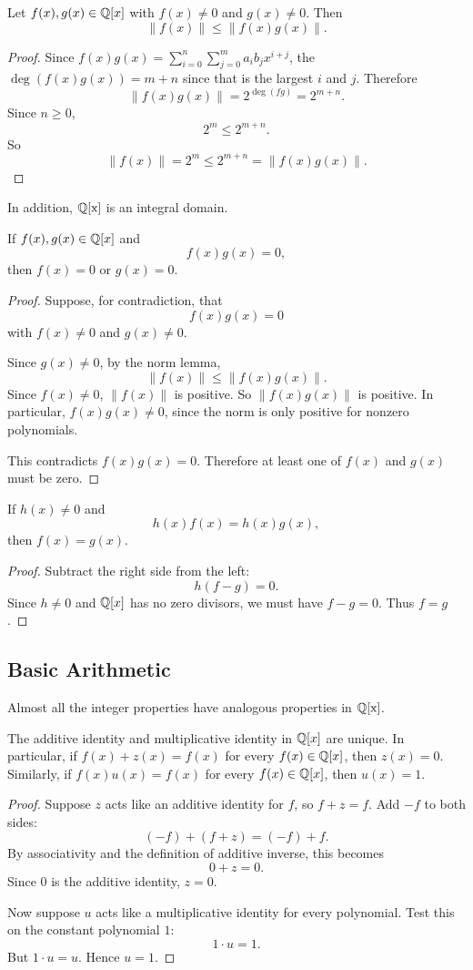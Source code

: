 \begin{lemma}
Let $f(x),g(x)\in\mathbb{Q}[x]$ with $f(x)\neq0$ and $g(x)\neq0$. Then
\[
\|f(x)\|\leq \|f(x)g(x)\|.
\]
\end{lemma}

\begin{proof}
Since $f(x)g(x) =  \sum_{i=0}^{n} \sum_{j=0}^{m} a_i b_j x^{i+j}$, the $\deg(f(x)g(x)) = m+n$ since that is the largest $i$ and $j$.
Therefore
\[
\|f(x)g(x)\|=2^{\deg(fg)}=2^{m+n}.
\]
Since $n\geq0$,
\[
2^m\leq2^{m+n}.
\]
So
\[
\|f(x)\|=2^m\leq2^{m+n}=\|f(x)g(x)\|.
\]
\end{proof}

In addition, $\operatorname{\mathbb{Q}[x]}$ is an integral domain.
\begin{theorem}
If $f(x),g(x)\in\mathbb{Q}[x]$ and
\[
f(x)g(x)=0,
\]
then $f(x)=0$ or $g(x)=0$.
\end{theorem}
\begin{proof}
Suppose, for contradiction, that
\[
f(x)g(x)=0
\]
with $f(x)\neq0$ and $g(x)\neq0$.

Since $g(x)\neq0$, by the norm lemma,
\[
\|f(x)\|\leq \|f(x)g(x)\|.
\]
Since $f(x)\neq0$, $\|f(x)\|$ is positive.
So $\|f(x)g(x)\|$ is positive. In particular, $f(x)g(x)\neq0$, since the norm
is only positive for nonzero polynomials.

This contradicts $f(x)g(x)=0$. Therefore at least one of $f(x)$ and $g(x)$
must be zero.
\end{proof}

\begin{corollary}[Cancellation]
If $h(x)\neq0$ and
\[
h(x)f(x)=h(x)g(x),
\]
then $f(x)=g(x)$.
\end{corollary}
\begin{proof}
Subtract the right side from the left:
\[
h(f-g)=0.
\]
Since $h\neq0$ and $\mathbb{Q}[x]$ has no zero divisors, we must have
$f-g=0$.  Thus $f=g$.
\end{proof}

\subsection{Basic Arithmetic}

Almost all the integer properties have analogous properties in $\operatorname{\mathbb{Q}[x]}$.
\begin{lemma}
The additive identity and multiplicative identity in $\mathbb{Q}[x]$ are unique.
In particular, if $f(x)+z(x)=f(x)$ for every $f(x)\in\mathbb{Q}[x]$, then
$z(x)=0$.  Similarly, if $f(x)u(x)=f(x)$ for every $f(x)\in\mathbb{Q}[x]$, then
$u(x)=1$.
\end{lemma}
\begin{proof}
Suppose $z$ acts like an additive identity for $f$, so $f+z=f$.  Add $-f$ to
both sides:
\[
(-f)+(f+z)=(-f)+f.
\]
By associativity and the definition of additive inverse, this becomes
\[
0+z=0.
\]
Since $0$ is the additive identity, $z=0$.

Now suppose $u$ acts like a multiplicative identity for every polynomial.  Test
this on the constant polynomial $1$:
\[
1\cdot u=1.
\]
But $1\cdot u=u$.  Hence $u=1$.
\end{proof}


